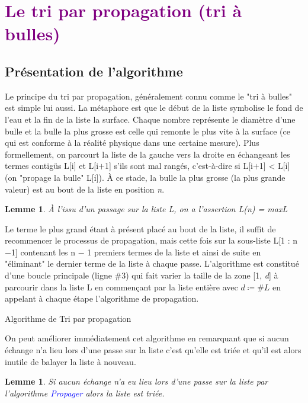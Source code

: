 \documentclass[a4paper,10pt]{article}
\newtheorem{lemme}[theoreme]{Lemme}
\begin{document}
\section{\textcolor{purple}{Le tri par propagation (tri à bulles)}}
\subsection{Présentation de l'algorithme}
Le principe du tri par propagation, généralement connu comme le "tri à bulles" est simple lui aussi. 
La mé­ta­pho­re est que le début de la liste symbolise le fond de l'eau et la fin de la liste la surface. 
Chaque nom­bre représente le diamètre d'une bulle et la bulle la plus grosse est celle qui remonte le plus vite 
à la surface (ce qui est conforme à la réalité physique dans une certaine mesure). Plus formellement, 
on parcourt la liste de la gauche vers la droite en échan­geant les termes contigüs L[i] et L[i$+$1] s'ils sont mal rangés, 
c'est-à-dire si L[i$+$1] < L[i] (on "propage la bulle" L[i]). À ce stade, la bulle la plus grosse 
(la plus grande valeur) est au bout de la liste en position {\itshape n}. 

\begin{lemme}
    À l'issu d'un passage sur la liste L, on a l'assertion L(n) = maxL
\end{lemme}

Le terme le plus grand étant à présent placé au bout de la liste, il suffit de recommencer 
le processus de propagation, mais cette fois sur la sous-liste L[1 : n$-$1] con­te­nant les n $-$ 1 
premiers termes de la liste et ainsi de suite en "éliminant" le dernier terme de la liste à chaque passe. 
L'algorithme est constitué d'une boucle principale (ligne \#3) qui fait varier la taille de la zone [1, {\itshape d}]
à parcourir dans la liste L en commençant par la liste entière avec $d \coloneqq \#L$
en appelant à chaque étape l'algorithme de propagation.
\label{algotriabulle}
\begin{center}
    Algorithme de Tri par propagation
\end{center}

On peut améliorer immédiatement cet algorithme en remarquant que si aucun échange n'a lieu 
lors d'une passe sur la liste c'est qu'elle est triée et qu'il est alors inutile de balayer la liste à nouveau.

\begin{lemme}
    Si aucun échange n'a eu lieu lors d'une passe sur la liste par l'algorithme \textcolor{blue}{Propager} 
    alors la liste est triée.
\end{lemme}
\end{document}
